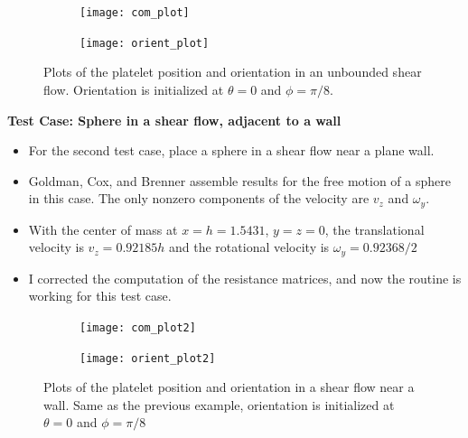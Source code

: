 \documentclass{article}
\begin{document}
\begin{figure}
  \centering
  \begin{subfigure}{0.49\textwidth}
    \texttt{[image: com\_plot]}    
  \end{subfigure}
  \hfill
  \begin{subfigure}{0.49\textwidth}
    \texttt{[image: orient\_plot]}
  \end{subfigure}
  \caption{Plots of the platelet position and orientation in an
    unbounded shear flow. Orientation is initialized at $\theta = 0$
    and $\phi = \pi/8$.}
  \label{fig:com_plot}
\end{figure}

\newpage

\textbf{Test Case: Sphere in a shear flow, adjacent to a wall}
\begin{itemize}
\item For the second test case, place a sphere in a shear flow near a
  plane wall.
\item Goldman, Cox, and Brenner \cite{Goldman1967b} assemble results
  for the free motion of a sphere in this case. The only nonzero
  components of the velocity are $v_z$ and $\omega_y$.
\item With the center of mass at $x = h = 1.5431$, $y = z = 0$, the
  translational velocity is $v_z = 0.92185 h$ and the rotational
  velocity is $\omega_y = 0.92368 / 2$
\item I corrected the computation of the resistance matrices, and now
  the routine is working for this test case.
\end{itemize}

\begin{figure}
  \centering
  \begin{subfigure}{0.49\textwidth}
    \texttt{[image: com\_plot2]}
  \end{subfigure}
  \hfill
  \begin{subfigure}{0.49\textwidth}
    \texttt{[image: orient\_plot2]}
  \end{subfigure}
  \caption{Plots of the platelet position and orientation in a shear
    flow near a wall. Same as the previous example, orientation is
    initialized at $\theta = 0$ and $\phi = \pi/8$}
  \label{fig:com_plot2}
\end{figure}



\end{document}
